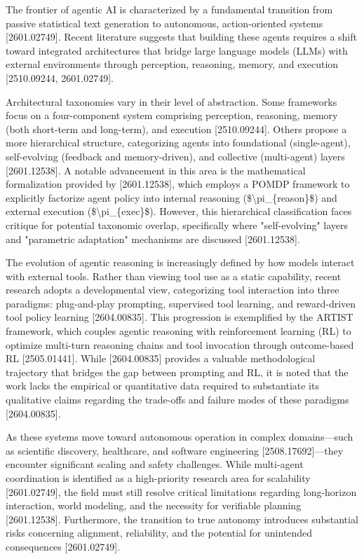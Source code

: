 \documentclass[11pt]{article}
\begin{document}
The frontier of agentic AI is characterized by a fundamental transition from passive statistical text generation to autonomous, action-oriented systems [2601.02749]. Recent literature suggests that building these agents requires a shift toward integrated architectures that bridge large language models (LLMs) with external environments through perception, reasoning, memory, and execution [2510.09244, 2601.02749].

Architectural taxonomies vary in their level of abstraction. Some frameworks focus on a four-component system comprising perception, reasoning, memory (both short-term and long-term), and execution [2510.09244]. Others propose a more hierarchical structure, categorizing agents into foundational (single-agent), self-evolving (feedback and memory-driven), and collective (multi-agent) layers [2601.12538]. A notable advancement in this area is the mathematical formalization provided by [2601.12538], which employs a POMDP framework to explicitly factorize agent policy into internal reasoning (\$\textbackslash{}pi\_\{reason\}\$) and external execution (\$\textbackslash{}pi\_\{exec\}\$). However, this hierarchical classification faces critique for potential taxonomic overlap, specifically where "self-evolving" layers and "parametric adaptation" mechanisms are discussed [2601.12538].

The evolution of agentic reasoning is increasingly defined by how models interact with external tools. Rather than viewing tool use as a static capability, recent research adopts a developmental view, categorizing tool interaction into three paradigms: plug-and-play prompting, supervised tool learning, and reward-driven tool policy learning [2604.00835]. This progression is exemplified by the ARTIST framework, which couples agentic reasoning with reinforcement learning (RL) to optimize multi-turn reasoning chains and tool invocation through outcome-based RL [2505.01441]. While [2604.00835] provides a valuable methodological trajectory that bridges the gap between prompting and RL, it is noted that the work lacks the empirical or quantitative data required to substantiate its qualitative claims regarding the trade-offs and failure modes of these paradigms [2604.00835].

As these systems move toward autonomous operation in complex domains—such as scientific discovery, healthcare, and software engineering [2508.17692]—they encounter significant scaling and safety challenges. While multi-agent coordination is identified as a high-priority research area for scalability [2601.02749], the field must still resolve critical limitations regarding long-horizon interaction, world modeling, and the necessity for verifiable planning [2601.12538]. Furthermore, the transition to true autonomy introduces substantial risks concerning alignment, reliability, and the potential for unintended consequences [2601.02749].
\end{document}
